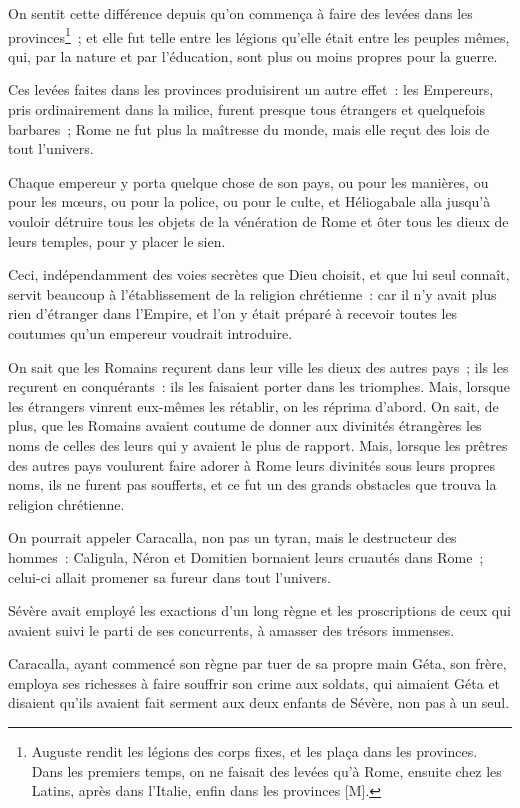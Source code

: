 \documentclass[french,twoside]{book} %
\begin{document}
On sentit cette différence depuis qu’on commença à faire des levées dans les provinces\footnote{Auguste rendit les légions des corps fixes, et les plaça dans les provinces. Dans les premiers temps, on ne faisait des levées qu’à Rome, ensuite chez les Latins, après dans l’Italie, enfin dans les provinces [M].} ; et elle fut telle entre les légions qu’elle était entre les peuples mêmes, qui, par la nature et par l’éducation, sont plus ou moins propres pour la guerre.\par
Ces levées faites dans les provinces produisirent un autre effet : les Empereurs, pris ordinairement dans la milice, furent presque tous étrangers et quelquefois barbares ; Rome ne fut plus la maîtresse du monde, mais elle reçut des lois de tout l’univers.\par
Chaque empereur y porta quelque chose de son pays, ou pour les manières, ou pour les mœurs, ou pour la police, ou pour le culte, et Héliogabale alla jusqu’à vouloir détruire tous les objets de la vénération de Rome et ôter tous les dieux de leurs temples, pour y placer le sien.\par
Ceci, indépendamment des voies secrètes que Dieu choisit, et que lui seul connaît, servit beaucoup à l’établissement de la religion chrétienne : car il n’y avait plus rien d’étranger dans l’Empire, et l’on y était préparé à recevoir toutes les coutumes qu’un empereur voudrait introduire.\par
On sait que les Romains reçurent dans leur ville les dieux des autres pays ; ils les reçurent en conquérants : ils les faisaient porter dans les triomphes. Mais, lorsque les étrangers vinrent eux-mêmes les rétablir, on les réprima d’abord. On sait, de plus, que les Romains avaient coutume de donner aux divinités étrangères les noms de celles des leurs qui y avaient le plus de rapport. Mais, lorsque les prêtres des autres pays voulurent faire adorer à Rome leurs divinités sous leurs propres noms, ils ne furent pas soufferts, et ce fut un des grands obstacles que trouva la religion chrétienne.\par
On pourrait appeler Caracalla, non pas un tyran, mais le destructeur des hommes : Caligula, Néron et Domitien bornaient leurs cruautés dans Rome ; celui-ci allait promener sa fureur dans tout l’univers.\par
Sévère avait employé les exactions d’un long règne et les proscriptions de ceux qui avaient suivi le parti de ses concurrents, à amasser des trésors immenses.\par
Caracalla, ayant commencé son règne par tuer de sa propre main Géta, son frère, employa ses richesses à faire souffrir son crime aux soldats, qui aimaient Géta et disaient qu’ils avaient fait serment aux deux enfants de Sévère, non pas à un seul.\par
\end{document}
